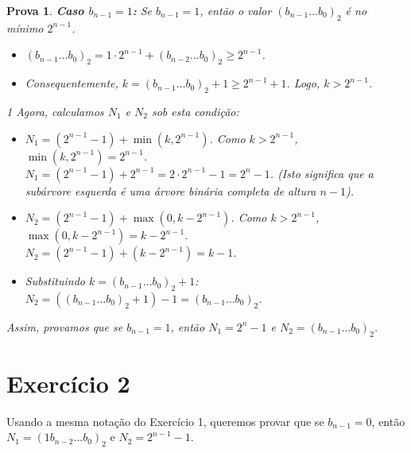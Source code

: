 \documentclass[11pt,reqno,a4paper]{amsart}
\theoremstyle{prova_style}
\newtheorem*{prova}{Prova} %
\begin{document}
\begin{prova}
\textbf{Caso $b_{n-1}=1$:}
Se $b_{n-1}=1$, então o valor $(b_{n-1} \dots b_0)_2$ é no mínimo $2^{n-1}$.
\begin{itemize}
    \item $(b_{n-1} \dots b_0)_2 = 1 \cdot 2^{n-1} + (b_{n-2} \dots b_0)_2 \geq 2^{n-1}$.
    \item Consequentemente, $k = (b_{n-1} \dots b_0)_2 + 1 \geq 2^{n-1} + 1$. Logo, $k > 2^{n-1}$.
\end{itemize}1
Agora, calculamos $N_1$ e $N_2$ sob esta condição:
\begin{itemize}
    \item $N_1 = (2^{n-1} - 1) + \min(k, 2^{n-1})$. Como $k > 2^{n-1}$, $\min(k, 2^{n-1}) = 2^{n-1}$.\\
          $N_1 = (2^{n-1} - 1) + 2^{n-1} = 2 \cdot 2^{n-1} - 1 = \boxed{2^n - 1}$.
          (Isto significa que a subárvore esquerda é uma árvore binária completa de altura $n-1$).
    \item $N_2 = (2^{n-1} - 1) + \max(0, k - 2^{n-1})$. Como $k > 2^{n-1}$, $\max(0, k - 2^{n-1}) = k - 2^{n-1}$.\\
          $N_2 = (2^{n-1} - 1) + (k - 2^{n-1}) = k - 1$.
    \item Substituindo $k = (b_{n-1} \dots b_0)_2 + 1$: \\
          $N_2 = ((b_{n-1} \dots b_0)_2 + 1) - 1 = \boxed{(b_{n-1} \dots b_0)_2}$.
\end{itemize}
Assim, provamos que se $b_{n-1}=1$, então $N_1 = 2^n - 1$ e $N_2 = (b_{n-1} \dots b_0)_2$.
\end{prova}

\newpage

\section{Exercício 2}
Usando a mesma notação do Exercício 1, queremos provar que se $b_{n-1}=0$, então $N_1=(1b_{n-2}\dots b_0)_2$ e $N_2=2^{n-1}-1$.
\end{document}

